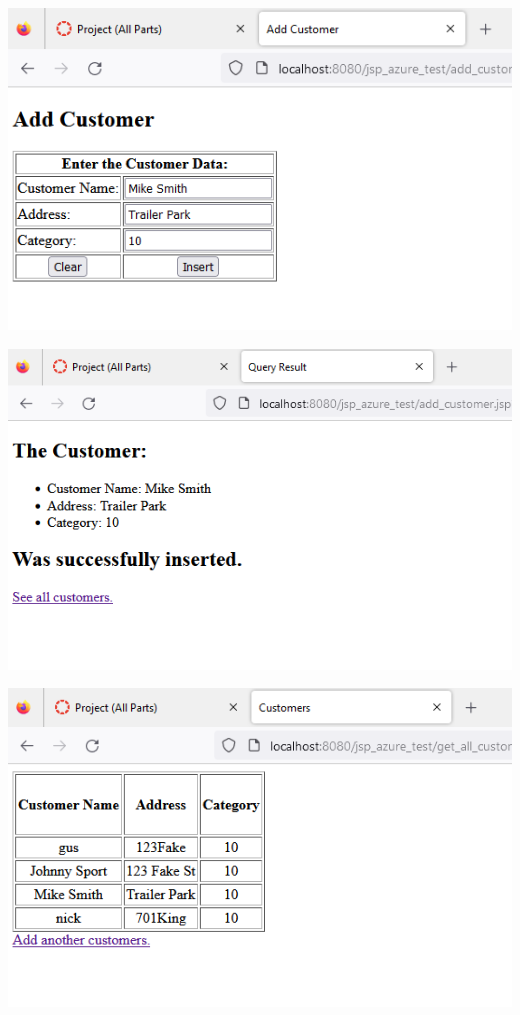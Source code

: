 \documentclass[11pt]{article}
\begin{document}
\includegraphics[width = \textwidth]{web3.png}

\includegraphics[width = \textwidth]{web4.png}

\includegraphics[width = \textwidth]{web5.png}
\end{document}
